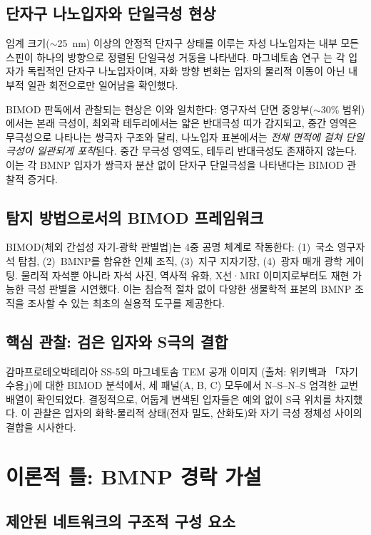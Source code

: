\documentclass[12pt,a4paper]{article}
\begin{document}
\subsection{단자구 나노입자와 단일극성 현상}
임계 크기($\sim$25~nm) 이상의 안정적 단자구 상태를 이루는 자성 나노입자는
내부 모든 스핀이 하나의 방향으로 정렬된 단일극성 거동을 나타낸다.
마그네토솜 연구 \cite{kornig2020}는 각 입자가 독립적인 단자구 나노입자이며,
자화 방향 변화는 입자의 물리적 이동이 아닌 내부적 일관 회전으로만
일어남을 확인했다.

BIMOD 판독에서 관찰되는 현상은 이와 일치한다:
영구자석 단면 중앙부($\sim$30\% 범위)에서는 본래 극성이,
최외곽 테두리에서는 얇은 반대극성 띠가 감지되고,
중간 영역은 무극성으로 나타나는 쌍극자 구조와 달리,
나노입자 표본에서는 \emph{전체 면적에 걸쳐 단일 극성이 일관되게 포착}된다.
중간 무극성 영역도, 테두리 반대극성도 존재하지 않는다.
이는 각 BMNP 입자가 쌍극자 분산 없이 단자구 단일극성을 나타낸다는
BIMOD 관찰적 증거다.

\subsection{탐지 방법으로서의 BIMOD 프레임워크}
BIMOD(체외 간섭성 자기-광학 판별법)는 4중 공명 체계로 작동한다:
(1)~국소 영구자석 탐침, (2)~BMNP를 함유한 인체 조직,
(3)~지구 지자기장, (4)~광자 매개 광학 게이팅.
물리적 자석뿐 아니라 자석 사진, 역사적 유화, X선·MRI 이미지로부터도
재현 가능한 극성 판별을 시연했다.
이는 침습적 절차 없이 다양한 생물학적 표본의 BMNP 조직을 조사할 수 있는
최초의 실용적 도구를 제공한다.

\subsection{핵심 관찰: 검은 입자와 S극의 결합}
감마프로테오박테리아 SS-5의 마그네토솜 TEM 공개 이미지
(출처: 위키백과 「자기수용」)에 대한 BIMOD 분석에서,
세 패널(A, B, C) 모두에서 N--S--N--S 엄격한 교번 배열이 확인되었다.
결정적으로, 어둡게 변색된 입자들은 예외 없이 S극 위치를 차지했다.
이 관찰은 입자의 화학-물리적 상태(전자 밀도, 산화도)와
자기 극성 정체성 사이의 결합을 시사한다.

\section{이론적 틀: BMNP 경락 가설}

\subsection{제안된 네트워크의 구조적 구성 요소}
\end{document}
